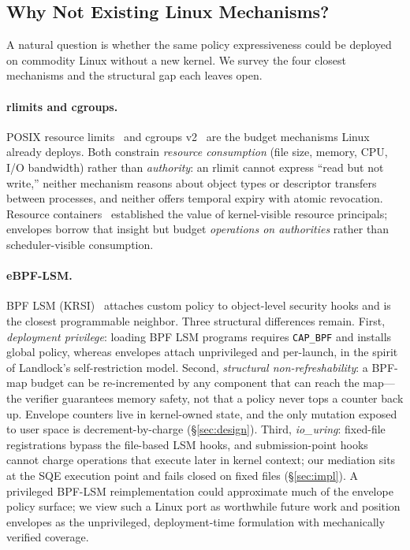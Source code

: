 \documentclass[letterpaper,twocolumn,10pt]{article}
\begin{document}
\subsection{Why Not Existing Linux Mechanisms?}
\label{sec:positioning}

A natural question is whether the same policy expressiveness could be
deployed on commodity Linux without a new kernel.  We survey the four
closest mechanisms and the structural gap each leaves open.

\paragraph{rlimits and cgroups.}
POSIX resource limits~\cite{setrlimit2017} and cgroups
v2~\cite{cgroupsv2} are the budget mechanisms Linux already deploys.
Both constrain \emph{resource consumption} (file size, memory, CPU,
I/O bandwidth) rather than \emph{authority}: an rlimit cannot express
``read but not write,'' neither mechanism reasons about object types or
descriptor transfers between processes, and neither offers temporal
expiry with atomic revocation.  Resource containers~\cite{banga1999rc}
established the value of kernel-visible resource principals; envelopes
borrow that insight but budget \emph{operations on authorities} rather
than scheduler-visible consumption.

\paragraph{eBPF-LSM.}
BPF LSM (KRSI)~\cite{krsi2019} attaches custom policy to object-level
security hooks and is the closest programmable neighbor.  Three
structural differences remain.  First, \emph{deployment privilege}:
loading BPF LSM programs requires \texttt{CAP\_BPF} and installs global
policy, whereas envelopes attach unprivileged and per-launch, in the
spirit of Landlock's self-restriction model.  Second,
\emph{structural non-refreshability}: a BPF-map budget can be
re-incremented by any component that can reach the map---the verifier
guarantees memory safety, not that a policy never tops a counter back
up.  Envelope counters live in kernel-owned state, and the only
mutation exposed to user space is decrement-by-charge
(\S\ref{sec:design}).  Third, \emph{io\_uring}: fixed-file
registrations bypass the file-based LSM hooks, and submission-point
hooks cannot charge operations that execute later in kernel context;
our mediation sits at the SQE execution point and fails closed on
fixed files (\S\ref{sec:impl}).  A privileged BPF-LSM reimplementation
could approximate much of the envelope policy surface; we view such a
Linux port as worthwhile future work and position envelopes as the
unprivileged, deployment-time formulation with mechanically verified
coverage.
\end{document}

